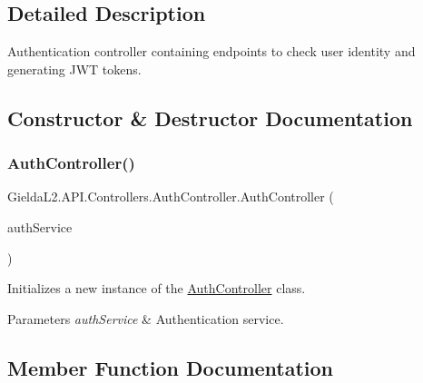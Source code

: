 \subsection{Detailed Description}
Authentication controller containing endpoints to check user identity and generating J\+WT tokens. 



\subsection{Constructor \& Destructor Documentation}
\mbox{\label{class_gielda_l2_1_1_a_p_i_1_1_controllers_1_1_auth_controller_a712994fbcc88bd7badac6459a856e0cc}} 
\subsubsection{\texorpdfstring{AuthController()}{AuthController()}}
{\footnotesize\ttfamily Gielda\+L2.\+A\+P\+I.\+Controllers.\+Auth\+Controller.\+Auth\+Controller (\begin{DoxyParamCaption}\item[{\mbox{\hyperlink{interface_gielda_l2_1_1_i_n_f_r_a_s_t_r_u_c_t_u_r_e_1_1_interfaces_1_1_i_auth_service}{I\+Auth\+Service}}}]{auth\+Service }\end{DoxyParamCaption})}



Initializes a new instance of the \mbox{\hyperlink{class_gielda_l2_1_1_a_p_i_1_1_controllers_1_1_auth_controller}{Auth\+Controller}} class. 


\begin{DoxyParams}{Parameters}
{\em auth\+Service} & Authentication service.\\
\hline
\end{DoxyParams}


\subsection{Member Function Documentation}
\mbox{\label{class_gielda_l2_1_1_a_p_i_1_1_controllers_1_1_auth_controller_a59d18da2df4b70759ed8d3803c2b4605}} 
